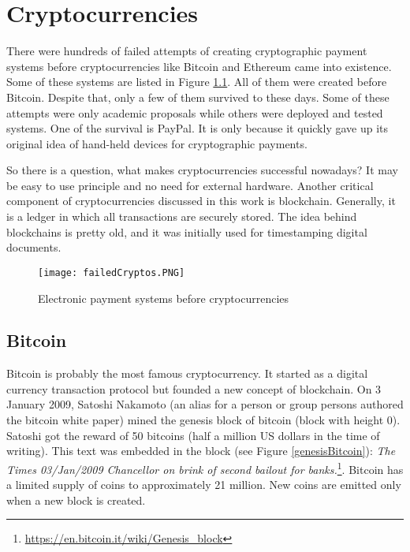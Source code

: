 \chapter{Cryptocurrencies}
\label{Cryptocurrencies}

There were hundreds of failed attempts of creating cryptographic payment systems before cryptocurrencies like Bitcoin and Ethereum came into existence. Some of these systems are listed in Figure \ref{paymentSystems}. All of them were created before Bitcoin. Despite that, only a few of them survived to these days. Some of these attempts were only academic proposals while others were deployed and tested systems. One of the survival is PayPal. It is only because it quickly gave up its original idea of hand-held devices for cryptographic payments.\cite{wayner1997digital}

So there is a question, what makes cryptocurrencies successful nowadays?  It may be easy to use principle and no need for external hardware. 
Another critical component of cryptocurrencies discussed in this work is blockchain. Generally, it is a ledger in which all transactions are securely stored. The idea behind blockchains is pretty old, and it was initially used for timestamping digital documents.\cite{haber1990time} 


\begin{figure}[h]
    \centering
    \texttt{[image: failedCryptos.PNG]}
    \caption{Electronic payment systems before cryptocurrencies\cite{narayanan2016bitcoin}}
    \label{paymentSystems}
\end{figure}


\section{Bitcoin}
Bitcoin is probably the most famous cryptocurrency. It started as a digital currency transaction protocol but founded a new concept of blockchain\cite{ChowdhuryNiaz2020Ibba}. On 3 January 2009, Satoshi Nakamoto (an alias for a person or group persons authored the bitcoin white paper) mined the genesis block of bitcoin (block with height 0). Satoshi got the reward of 50 bitcoins (half a million US dollars in the time of writing). This text was embedded in the block (see Figure \ref{genesisBitcoin}): \textit{The Times 03/Jan/2009 Chancellor on brink of second bailout for banks.}\footnote{\url{https://en.bitcoin.it/wiki/Genesis\_block}}\cite{newYorkerBTC}. Bitcoin has a limited supply of coins to approximately 21 million. New coins are emitted only when a new block is created.\cite{nakamoto2008peer}

